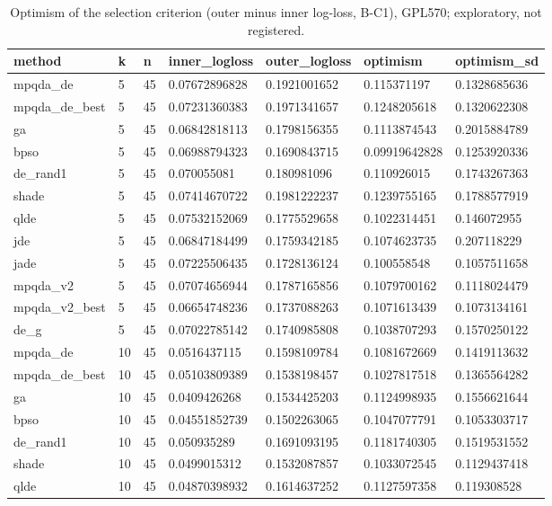 \begin{table}[t]
\centering
\caption{Optimism of the selection criterion (outer minus inner log-loss, B-C1), GPL570; exploratory, not registered.}\label{tab:optimism_v2}
\begin{tabular}{lllllll}
\hline
method & k & n & inner\_logloss & outer\_logloss & optimism & optimism\_sd \\
\hline
mpqda\_de & 5 & 45 & 0.07672896828 & 0.1921001652 & 0.115371197 & 0.1328685636 \\
mpqda\_de\_best & 5 & 45 & 0.07231360383 & 0.1971341657 & 0.1248205618 & 0.1320622308 \\
ga & 5 & 45 & 0.06842818113 & 0.1798156355 & 0.1113874543 & 0.2015884789 \\
bpso & 5 & 45 & 0.06988794323 & 0.1690843715 & 0.09919642828 & 0.1253920336 \\
de\_rand1 & 5 & 45 & 0.070055081 & 0.180981096 & 0.110926015 & 0.1743267363 \\
shade & 5 & 45 & 0.07414670722 & 0.1981222237 & 0.1239755165 & 0.1788577919 \\
qlde & 5 & 45 & 0.07532152069 & 0.1775529658 & 0.1022314451 & 0.146072955 \\
jde & 5 & 45 & 0.06847184499 & 0.1759342185 & 0.1074623735 & 0.207118229 \\
jade & 5 & 45 & 0.07225506435 & 0.1728136124 & 0.100558548 & 0.1057511658 \\
mpqda\_v2 & 5 & 45 & 0.07074656944 & 0.1787165856 & 0.1079700162 & 0.1118024479 \\
mpqda\_v2\_best & 5 & 45 & 0.06654748236 & 0.1737088263 & 0.1071613439 & 0.1073134161 \\
de\_g & 5 & 45 & 0.07022785142 & 0.1740985808 & 0.1038707293 & 0.1570250122 \\
mpqda\_de & 10 & 45 & 0.0516437115 & 0.1598109784 & 0.1081672669 & 0.1419113632 \\
mpqda\_de\_best & 10 & 45 & 0.05103809389 & 0.1538198457 & 0.1027817518 & 0.1365564282 \\
ga & 10 & 45 & 0.0409426268 & 0.1534425203 & 0.1124998935 & 0.1556621644 \\
bpso & 10 & 45 & 0.04551852739 & 0.1502263065 & 0.1047077791 & 0.1053303717 \\
de\_rand1 & 10 & 45 & 0.050935289 & 0.1691093195 & 0.1181740305 & 0.1519531552 \\
shade & 10 & 45 & 0.0499015312 & 0.1532087857 & 0.1033072545 & 0.1129437418 \\
qlde & 10 & 45 & 0.04870398932 & 0.1614637252 & 0.1127597358 & 0.119308528 \\

\end{tabular}
\end{table}
